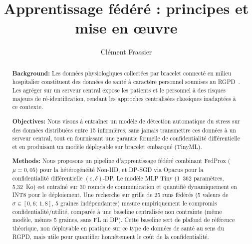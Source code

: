 \documentclass{article}
\begin{document}
\title[Apprentissage Fédéré - Détection de Stress]{Apprentissage fédéré : principes et mise en œuvre}

\author{Clément Frassier}

\begin{abstract}
{\bf Background:}
Les données physiologiques collectées par bracelet connecté en milieu hospitalier
constituent des données de santé à caractère personnel soumises au
RGPD~\cite{gdpr2016}. Les agréger sur un serveur central expose les patients et le
personnel à des risques majeurs de ré-identification, rendant les approches
centralisées classiques inadaptées à ce contexte.

{\bf Objectives:}
Nous visons à entraîner un modèle de détection automatique du stress sur des données
distribuées entre 15 infirmières, sans jamais transmettre ces données à un serveur
central, tout en fournissant une garantie formelle de confidentialité différentielle
et en produisant un modèle déployable sur bracelet embarqué (TinyML).

{\bf Methods:}
Nous proposons un pipeline d'apprentissage fédéré combinant FedProx ($\mu = 0{,}05$)
pour la hétérogénéité Non-IID, et DP-SGD via Opacus pour la confidentialité
différentielle $(\varepsilon, \delta)$-DP. Le modèle MLP Tiny (1~362 paramètres,
5,32~Ko) est entraîné sur 30 rounds de communication et quantifié dynamiquement en
INT8 pour le déploiement. Une recherche sur grille de 25 runs fédérés
(5 valeurs de $\sigma \in [0{,}6;\, 1{,}8]$, 5 graines indépendantes) mesure
empiriquement le compromis confidentialité/utilité, comparée à une baseline
centralisée non contrainte (même modèle, mêmes 5 graines, sans FL ni DP). Cette
baseline sert de plafond de référence théorique, non déployable en pratique sur ce
type de données de santé au sens du RGPD, mais utile pour quantifier honnêtement le
coût de la confidentialité.


\end{abstract}
\end{document}
